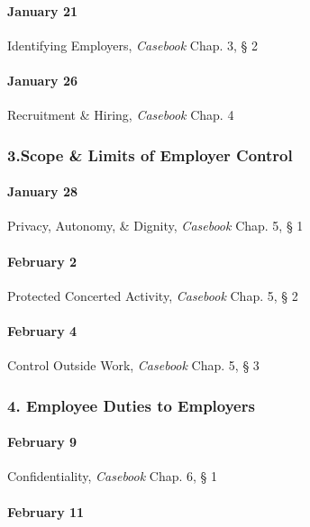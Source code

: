 \documentclass[11pt,letterpaper,twoside]{article}
\begin{document}
\paragraph{January 21}\label{january-21}

Identifying Employers, \emph{Casebook} Chap. 3, § 2

\paragraph{January 26}\label{january-26}

Recruitment \& Hiring, \emph{Casebook} Chap. 4

\subsubsection{3.Scope \& Limits of Employer
Control}\label{scope-limits-of-employer-control}

\paragraph{January 28}\label{january-28}

Privacy, Autonomy, \& Dignity, \emph{Casebook} Chap. 5, § 1

\paragraph{February 2}\label{february-2}

Protected Concerted Activity, \emph{Casebook} Chap. 5, § 2

\paragraph{February 4}\label{february-4}

Control Outside Work, \emph{Casebook} Chap. 5, § 3

\subsubsection{4. Employee Duties to
Employers}\label{employee-duties-to-employers}

\paragraph{February 9}\label{february-9}

Confidentiality, \emph{Casebook} Chap. 6, § 1

\paragraph{February 11}\label{february-11}
\end{document}

